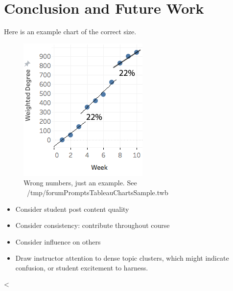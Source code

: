 \section{Conclusion and Future Work}

Here is an example chart of the correct size.
\begin{figure}[htp]
       \centering
       \includegraphics{Figs/exampleChart1.png}
       \caption{\textnormal{Wrong numbers, just an example. See ~/tmp/forumPromptsTableauChartsSample.twb}}
       \label{fig:exampleChart}
\end{figure}


\begin{itemize}
\item Consider student post content quality
\item Consider consistency: contribute throughout course
\item Consider influence on others
\item Draw instructor attention to dense topic clusters, which might
  indicate confusion, or student excitement to harness.
\end{itemize}
<
